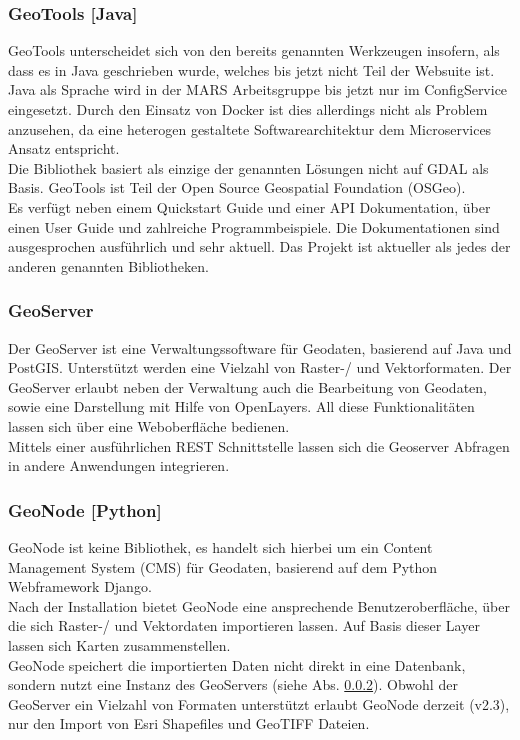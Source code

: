 \documentclass[10pt,conference,compsocconf]{IEEEtran}
\begin{document}
\subsubsection{GeoTools [Java]}
GeoTools unterscheidet sich von den bereits genannten Werkzeugen insofern, als dass es in Java geschrieben wurde, welches bis jetzt nicht Teil der Websuite ist. Java als Sprache wird in der MARS Arbeitsgruppe bis jetzt nur im ConfigService eingesetzt. Durch den Einsatz von Docker ist dies allerdings nicht als Problem anzusehen, da eine heterogen gestaltete Softwarearchitektur dem Microservices Ansatz entspricht.\\
Die Bibliothek basiert als einzige der genannten Lösungen nicht auf GDAL als Basis. GeoTools ist Teil der Open Source Geospatial Foundation (OSGeo).\\
Es verfügt neben einem Quickstart Guide und einer API Dokumentation, über einen User Guide und zahlreiche Programmbeispiele. Die Dokumentationen sind ausgesprochen ausführlich und sehr aktuell. Das Projekt ist aktueller als jedes der anderen genannten Bibliotheken.\\

\subsubsection{GeoServer}
\label{subsubsubsec:GeoServer}
Der GeoServer ist eine Verwaltungssoftware für Geodaten, basierend auf Java und PostGIS. Unterstützt werden eine Vielzahl von Raster-/ und Vektorformaten. Der GeoServer erlaubt neben der Verwaltung auch die Bearbeitung von Geodaten, sowie eine Darstellung mit Hilfe von OpenLayers. All diese Funktionalitäten lassen sich über eine Weboberfläche bedienen.\\
Mittels einer ausführlichen REST Schnittstelle lassen sich die Geoserver Abfragen in andere Anwendungen integrieren.\\

\subsubsection{GeoNode [Python]}
GeoNode ist keine Bibliothek, es handelt sich hierbei um ein Content Management System (CMS) für Geodaten, basierend auf dem Python Webframework Django.\\
Nach der Installation bietet GeoNode eine ansprechende Benutzeroberfläche, über die sich Raster-/ und Vektordaten importieren lassen. Auf Basis dieser Layer lassen sich Karten zusammenstellen.\\
GeoNode speichert die importierten Daten nicht direkt in eine Datenbank, sondern nutzt eine Instanz des GeoServers (siehe Abs. \ref{subsubsubsec:GeoServer}). Obwohl der GeoServer ein Vielzahl von Formaten unterstützt erlaubt GeoNode derzeit (v2.3), nur den Import von Esri Shapefiles und GeoTIFF Dateien.\\
\end{document}
